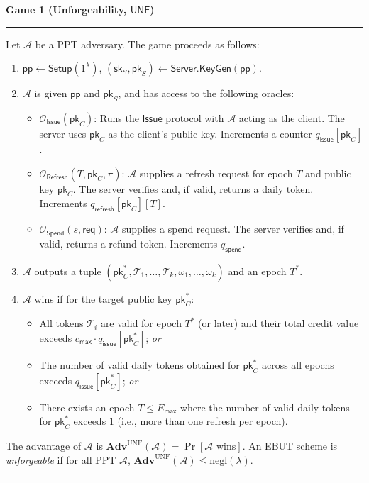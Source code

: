 \documentclass[11pt]{article}
\theoremstyle{definitionstyle}
\theoremstyle{plain}
\newenvironment{game}[2][]
  {\par\addvspace{\topsep}\noindent\textbf{Game #2}\ #1\par\nobreak\smallskip\hrule\smallskip}
  {\hrule\par\addvspace{\topsep}}
\newcommand{\advantage}[1]{\mathbf{Adv}^{\mathrm{#1}}}
\newcommand{\negl}{\mathrm{negl}}
\begin{document}
\begin{game}{1 (Unforgeability, $\mathsf{UNF}$)}
Let $\mathcal{A}$ be a PPT adversary. The game proceeds as follows:
\begin{enumerate}[leftmargin=*]
\item $\mathsf{pp} \leftarrow \mathsf{Setup}(1^\lambda)$, $(\mathsf{sk}_S, \mathsf{pk}_S) \leftarrow \mathsf{Server.KeyGen}(\mathsf{pp})$.
\item $\mathcal{A}$ is given $\mathsf{pp}$ and $\mathsf{pk}_S$, and has access to the following oracles:
  \begin{itemize}
  \item $\mathcal{O}_{\mathsf{Issue}}(\mathsf{pk}_C)$: Runs the $\mathsf{Issue}$ protocol with $\mathcal{A}$ acting as the client. The server uses $\mathsf{pk}_C$ as the client's public key. Increments a counter $q_{\mathsf{issue}}[\mathsf{pk}_C]$.
  \item $\mathcal{O}_{\mathsf{Refresh}}(T, \mathsf{pk}_C, \pi)$: $\mathcal{A}$ supplies a refresh request for epoch $T$ and public key $\mathsf{pk}_C$. The server verifies and, if valid, returns a daily token. Increments $q_{\mathsf{refresh}}[\mathsf{pk}_C][T]$.
  \item $\mathcal{O}_{\mathsf{Spend}}(s, \mathsf{req})$: $\mathcal{A}$ supplies a spend request. The server verifies and, if valid, returns a refund token. Increments $q_{\mathsf{spend}}$.
  \end{itemize}
\item $\mathcal{A}$ outputs a tuple $(\mathsf{pk}_C^*, \mathcal{T}_1, \dots, \mathcal{T}_k, \omega_1, \dots, \omega_k)$ and an epoch $T^*$.
\item $\mathcal{A}$ wins if for the target public key $\mathsf{pk}_C^*$:
  \begin{itemize}
  \item All tokens $\mathcal{T}_i$ are valid for epoch $T^*$ (or later) and their total credit value exceeds $c_{\mathsf{max}} \cdot q_{\mathsf{issue}}[\mathsf{pk}_C^*]$; \emph{or}
  \item The number of valid daily tokens obtained for $\mathsf{pk}_C^*$ across all epochs exceeds $q_{\mathsf{issue}}[\mathsf{pk}_C^*]$; \emph{or}
  \item There exists an epoch $T \le E_{\mathsf{max}}$ where the number of valid daily tokens for $\mathsf{pk}_C^*$ exceeds $1$ (i.e., more than one refresh per epoch).
  \end{itemize}
\end{enumerate}
The advantage of $\mathcal{A}$ is $\advantage{UNF}(\mathcal{A}) = \Pr[\mathcal{A} \text{ wins}]$. An EBUT scheme is \emph{unforgeable} if for all PPT $\mathcal{A}$, $\advantage{UNF}(\mathcal{A}) \le \negl(\lambda)$.
\end{game}
\end{document}
